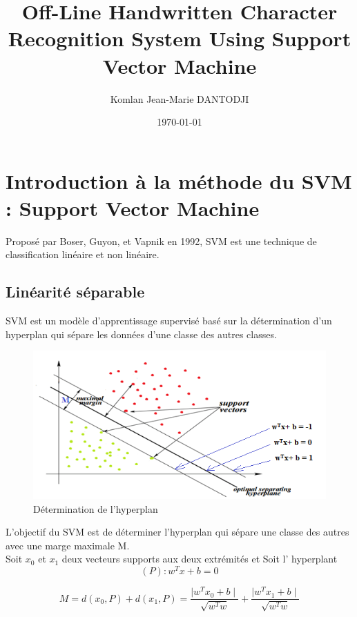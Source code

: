 \documentclass[12pt, letterpaper]{article}
\title{Off-Line Handwritten Character Recognition System Using Support Vector Machine}
\author{Komlan Jean-Marie DANTODJI
\\
    \multicolumn{1}{
        p{.7\textwidth}}{\centering\emph{Université Paris Vincennes St-Denis\\
  M1 Big Data\\}
  }
}
\date{\today}
\begin{document}
\begin{titlepage}
    \maketitle
\end{titlepage}

\tableofcontents

\newpage
\section{Introduction à la méthode du SVM : Support Vector Machine}
\par Proposé par Boser, Guyon, et Vapnik en 1992, SVM est une technique de classification linéaire et non linéaire.\\
\subsection{Linéarité séparable}
\par SVM est un modèle d’apprentissage supervisé basé sur la détermination d’un hyperplan qui sépare les données d’une classe des autres classes.
\begin{figure}[H]
    \includegraphics[width=\linewidth]{images/svm_separate.png}
    \caption{Détermination de l’hyperplan}
    \label{fig:L1}
\end{figure}
\par L’objectif du SVM est de déterminer l’hyperplan qui sépare une classe des autres avec une marge maximale M.  \\
Soit $x_0$ et $x_1$ deux vecteurs supports aux deux extrémités et
Soit l' hyperplant $$(P): w^Tx+b=0$$

$$M = d(x_{0},P)+d(x_{1},P) = \frac{\mid{w^{T}x_{0}+b}\mid}{\sqrt{w^{T}w} } + \frac{\mid{w^{T}x_{1}+b}\mid}{\sqrt{w^{T}w} } $$
\end{document}
